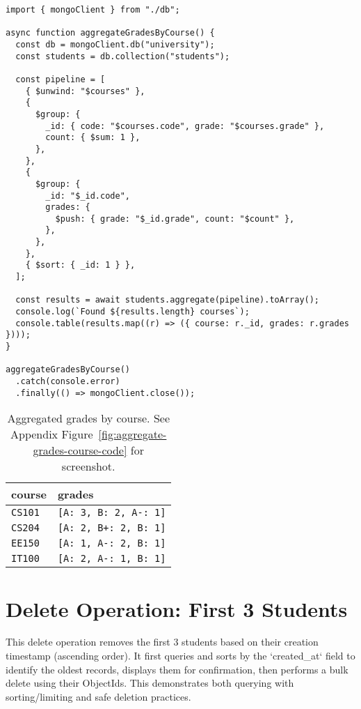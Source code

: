 \begin{verbatim}
import { mongoClient } from "./db";

async function aggregateGradesByCourse() {
  const db = mongoClient.db("university");
  const students = db.collection("students");

  const pipeline = [
    { $unwind: "$courses" },
    {
      $group: {
        _id: { code: "$courses.code", grade: "$courses.grade" },
        count: { $sum: 1 },
      },
    },
    {
      $group: {
        _id: "$_id.code",
        grades: {
          $push: { grade: "$_id.grade", count: "$count" },
        },
      },
    },
    { $sort: { _id: 1 } },
  ];

  const results = await students.aggregate(pipeline).toArray();
  console.log(`Found ${results.length} courses`);
  console.table(results.map((r) => ({ course: r._id, grades: r.grades })));
}

aggregateGradesByCourse()
  .catch(console.error)
  .finally(() => mongoClient.close());
\end{verbatim}

\begin{table}[H]
  \centering
  \begin{tabular}{|l|l|}
    \hline
    \textbf{course} & \textbf{grades} \\
    \hline
    \texttt{CS101} & \texttt{[A: 3, B: 2, A-: 1]} \\
    \texttt{CS204} & \texttt{[A: 2, B+: 2, B: 1]} \\
    \texttt{EE150} & \texttt{[A: 1, A-: 2, B: 1]} \\
    \texttt{IT100} & \texttt{[A: 2, A-: 1, B: 1]} \\
    \hline
  \end{tabular}
  \caption{Aggregated grades by course. See Appendix Figure~\ref{fig:aggregate-grades-course-code} for screenshot.}
\end{table}

\section{Delete Operation: First 3 Students}
This delete operation removes the first 3 students based on their creation timestamp (ascending order). It first queries and sorts by the `created\_at` field to identify the oldest records, displays them for confirmation, then performs a bulk delete using their ObjectIds. This demonstrates both querying with sorting/limiting and safe deletion practices.

